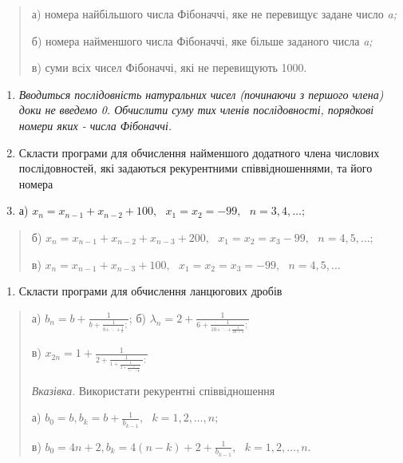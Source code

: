 \documentclass[]{article}
\begin{document}
\begin{quote}
а) номера найбільшого числа Фібоначчі, яке не перевищує задане число
\emph{a;}

б) номера найменшого числа Фібоначчі, яке більше заданого числа
\emph{a;}

в) суми всіх чисел Фібоначчі, які не перевищують 1000.
\end{quote}

\begin{enumerate}
\def\labelenumi{\arabic{enumi})}
\item
  \emph{Вводиться послідовність натуральних чисел (починаючи з першого
  члена) доки не введемо 0. Обчислити суму тих членів послідовності,
  порядкові номери яких - числа Фібоначчі.}
\item
  Скласти програми для обчислення найменшого додатного члена числових
  послідовностей, які задаються рекурентними співвідношеннями, та його
  номера
\item
  а)
  \(x_{n} = x_{n - 1} + x_{n - 2} + 100,\mathrm{\text{\ \ \ \ \ }}x_{1} = x_{2} = - 99,\mathrm{\text{\ \ \ }}n = 3,4,\ldots;\)
\end{enumerate}

\begin{quote}
б)
\(x_{n} = x_{n - 1} + x_{n - 2} + x_{n - 3} + 200,\mathrm{\text{\ \ \ \ \ }}x_{1} = x_{2} = x_{3} - 99,\mathrm{\text{\ \ \ }}n = 4,5,\ldots;\)

в)
\(x_{n} = x_{n - 1} + x_{n - 3} + 100,\mathrm{\text{\ \ \ \ \ }}x_{1} = x_{2} = x_{3} = - 99,\mathrm{\text{\ \ \ }}n = 4,5,\ldots\)
\end{quote}

\begin{enumerate}
\def\labelenumi{\arabic{enumi})}
\item
  Скласти програми для обчислення ланцюгових дробів
\end{enumerate}

\begin{quote}
а) \(b_{n} = b + \frac{1}{b + \frac{1}{b + \ddots + \frac{1}{b}};}\); б)
\(\lambda_{n} = 2 + \frac{1}{6 + \frac{1}{10 + \ddots + \frac{1}{4n + 2}};}\)

в)
\(x_{2n} = 1 + \frac{1}{2 + \frac{1}{1 + \frac{1}{2 + \frac{1}{1 + \ddots + \frac{1}{2}}}.};}\)

\emph{\emph{Вказівка}}. Використати рекурентні співвідношення

а)
\(b_{0} = b,b_{k} = b + \frac{1}{b_{k - 1}},\mathrm{\text{\ \ }}k = 1,2,\ldots,n;\)

в)
\(b_{0} = 4n + 2,b_{k} = 4(n - k) + 2 + \frac{1}{b_{k - 1}},\mathrm{\text{\ \ }}k = 1,2,\ldots,n.\)
\end{quote}
\end{document}

